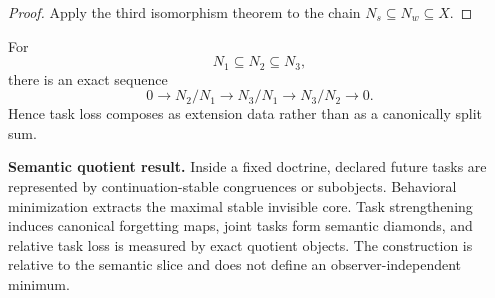 \begin{proof}
Apply the third isomorphism theorem to the chain \(N_s\subseteq N_w\subseteq X\).
\end{proof}

\begin{corollary}
\label{cor:block17-task-loss-composition}
For
\[
 N_1\subseteq N_2\subseteq N_3,
\]
there is an exact sequence
\[
 0\longrightarrow N_2/N_1
 \longrightarrow N_3/N_1
 \longrightarrow N_3/N_2
 \longrightarrow0.
\]
Hence task loss composes as extension data rather than as a canonically split sum.
\end{corollary}

\begin{resultbox}
\textbf{Semantic quotient result.}
Inside a fixed doctrine, declared future tasks are represented by continuation-stable congruences or subobjects.  Behavioral minimization extracts the maximal stable invisible core.  Task strengthening induces canonical forgetting maps, joint tasks form semantic diamonds, and relative task loss is measured by exact quotient objects.  The construction is relative to the semantic slice and does not define an observer-independent minimum.
\end{resultbox}
